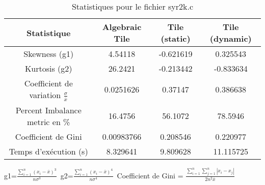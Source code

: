 \documentclass{article}
\begin{document}
\begin{table}[htbp]
  \centering
  \caption{Statistiques pour le fichier syr2k.c}
  \begin{tabular}{|c|c|c|c|}
    \hline
    Statistique & Algebraic Tile & Tile (static) & Tile (dynamic) \\ 
    \hline
    Skewness (g1)  & 4.54118 & -0.621619 & 0.325543 \\ 
    Kurtosis (g2)  & 26.2421 & -0.213442 & -0.833634 \\ 
    Coefficient de variation $ \frac{\sigma}{\overline{x}} $ & 0.0251626 & 0.37147 & 0.386638\\ 
    Percent Imbalance metric en \% & 16.4756 & 56.1072 & 78.5946\\ 
    Coefficient de Gini  & 0.00983766 & 0.208546 & 0.220977\\ 
    Temps d'exécution (s) &  8.329641    &  9.809628   &  11.115725   \\ 

    \hline
  \end{tabular}
\end{table}
g1=$ \frac{\sum_{i=1}^{n} (x_i - \overline{x})^3}{n\sigma^3} $\
g2=$ \frac{\sum_{i=1}^{n} (x_i - \overline{x})^4}{n\sigma^4} $\
Coefficient de Gini = $ \frac{\sum_{i=1}^{n}\sum_{j=1}^{n} |x_i - x_j|}{2n^2\overline{x}} $\
\newpage
\end{document}
